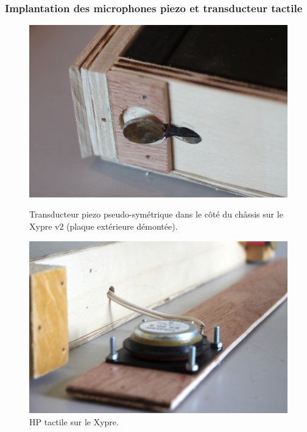 \subsubsection{Implantation des microphones piezo et transducteur tactile}
\begin{figure}[!htbp]
	\captionsetup{format=plain}%
	\centering
	\begin{minipage}[t]{0.48\textwidth}
	    \includegraphics[width=\linewidth]{gfx/05_interfaces/xypre-piezo_72dpi.jpg}
		\caption[Transducteur piezo pseudo-symétrique sur le Xypre]{Transducteur piezo pseudo-symétrique dans le côté du châssis sur le Xypre v2 (plaque extérieure démontée).}
		\label{fig:interface:xypre_v2-piezo1}
	\end{minipage}
	\hspace{.02\linewidth}
	\begin{minipage}[t]{0.48\textwidth}
	    \includegraphics[width=\linewidth]{gfx/05_interfaces/Xypre_HP_144dpi.jpg}
		\caption[HP tactile sur le Xypre]{HP tactile sur le Xypre.}
		\label{fig:interface:xypre_v2-hp}
	\end{minipage}
\end{figure}

